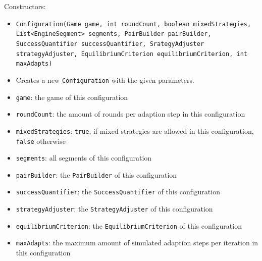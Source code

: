 \documentclass[parskip=full,11pt]{scrartcl}
\begin{document}
Constructors:
\begin{itemize}\itemsep -10pt
\item \texttt{Configuration(Game game, int roundCount, boolean mixedStrategies, List<EngineSegment> segments, PairBuilder pairBuilder, SuccessQuantifier successQuantifier, SrategyAdjuster strategyAdjuster, EquilibriumCriterion equilibriumCriterion, int maxAdapts)}
\item[] Creates a new \texttt{Configuration} with the given parameters.
\item[] \texttt{game}: the game of this configuration
\item[] \texttt{roundCount}: the amount of rounds per adaption step in this configuration
\item[] \texttt{mixedStrategies}: \texttt{true}, if mixed strategies are allowed in this configuration, \texttt{false} otherwise
\item[] \texttt{segments}: all segments of this configuration
\item[] \texttt{pairBuilder}: the \texttt{PairBuilder} of this configuration
\item[] \texttt{successQuantifier}: the \texttt{SuccessQuantifier} of this configuration
\item[] \texttt{strategyAdjuster}: the \texttt{StrategyAdjuster} of this configuration
\item[] \texttt{equilibriumCriterion}: the \texttt{EquilibriumCriterion} of this configuration
\item[] \texttt{maxAdapts}: the maximum amount of simulated adaption steps per iteration in this configuration
\end{itemize}
\end{document}
